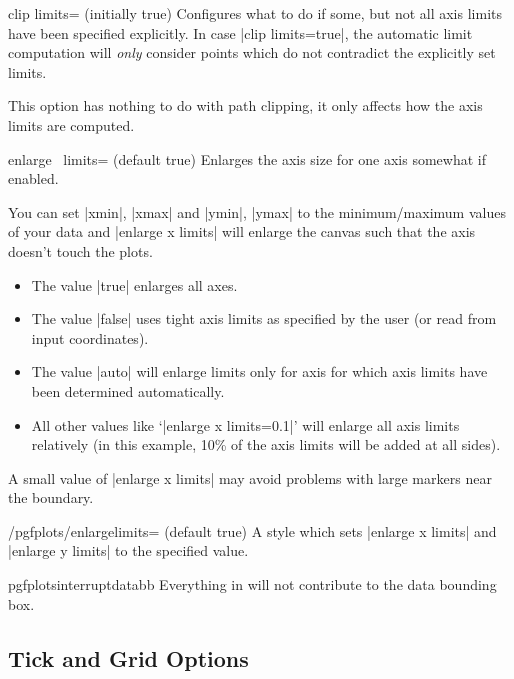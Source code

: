 \begin{pgfplotskey}{clip limits= (initially true)}
	Configures what to do if some, but not all axis limits have been specified explicitly. In case |clip limits=true|, the automatic limit computation will \emph{only} consider points which do not contradict the explicitly set limits. 

	This option has nothing to do with path clipping, it only affects how the axis limits are computed.
\end{pgfplotskey}

\begin{pgfplotsxykey}{enlarge \x\ limits= (default true)}
Enlarges the axis size for one axis somewhat if enabled.

You can set |xmin|, |xmax| and |ymin|, |ymax| to the minimum/maximum values of your data and |enlarge x limits| will enlarge the canvas such that the axis doesn't touch the plots.

\begin{itemize}
	\item The value |true| enlarges all axes.
	\item The value |false| uses tight axis limits as specified by the user (or read from input coordinates).
	\item The value |auto| will enlarge limits only for axis for which axis limits have been determined automatically.
	\item All other values like `|enlarge x limits=0.1|' will enlarge all axis limits relatively (in this example, 10\% of the axis limits will be added at all sides).
\end{itemize}
A small value of |enlarge x limits| may avoid problems with large markers near the boundary.
\end{pgfplotsxykey}

\begin{stylekey}{/pgfplots/enlargelimits= (default true)}
	A style which sets |enlarge x limits| and |enlarge y limits| to the specified value.
\end{stylekey}

\begin{environment}{{pgfplotsinterruptdatabb}}
	Everything in  will not contribute to the data bounding box.
\end{environment}

\subsection{Tick and Grid Options}

